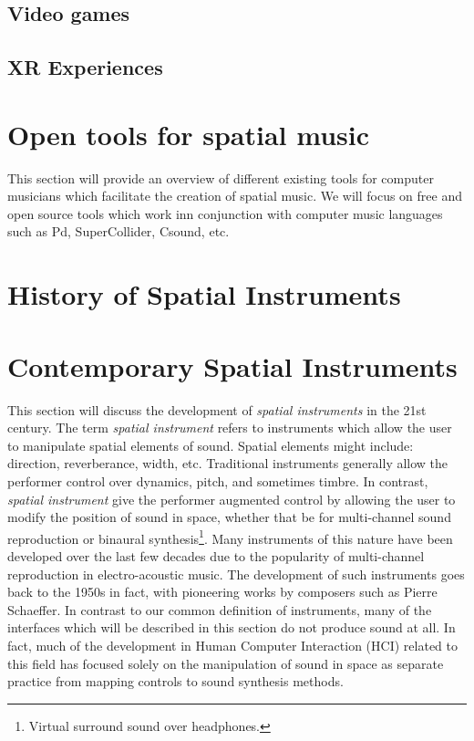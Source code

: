 \subsection{Video games}

\subsection{XR Experiences}

\section{Open tools for spatial music}\label{sec:open_tools_spat_mus}

This section will provide an overview of different existing tools for computer musicians which facilitate the creation of spatial music. We will focus on free and open source tools which work inn conjunction with computer music languages such as Pd, SuperCollider, Csound, etc. 

 

\section{History of Spatial Instruments} \label{sec:spat_instruments}
\section{Contemporary Spatial Instruments}

This section will discuss the development of \textit{spatial instruments} in the 21st century. The term \textit{spatial instrument} refers to instruments which allow the user to manipulate spatial elements of sound. Spatial elements might include: direction, reverberance, width, etc. Traditional instruments generally allow the performer control over dynamics, pitch, and sometimes timbre. In contrast, \textit{spatial instrument} give the performer augmented control by allowing the user to modify the position of sound in space, whether that be for multi-channel sound reproduction or binaural synthesis\footnote{Virtual surround sound over headphones.}. 
Many instruments of this nature have been developed over the last few decades due to the popularity of multi-channel reproduction in electro-acoustic music. The development of such instruments goes back to the 1950s in fact, with pioneering works by composers such as Pierre Schaeffer. In contrast to our common definition of instruments, many of the interfaces which will be described in this section do not produce sound at all. In fact, much of the development in Human Computer Interaction (HCI) related to this field has focused solely on the manipulation of sound in space as separate practice from mapping controls to sound synthesis methods.  

